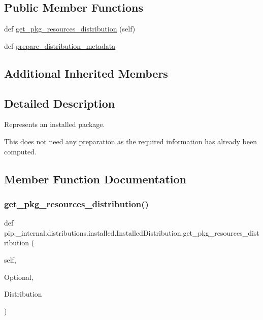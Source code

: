 \subsection*{Public Member Functions}
\begin{DoxyCompactItemize}
\item 
def \hyperlink{classpip_1_1__internal_1_1distributions_1_1installed_1_1InstalledDistribution_a9b4eab516d005429ca1562d5ec489ad4}{get\+\_\+pkg\+\_\+resources\+\_\+distribution} (self)
\item 
def \hyperlink{classpip_1_1__internal_1_1distributions_1_1installed_1_1InstalledDistribution_ab398383b63bcbe0767b61cfc8fa0bb7c}{prepare\+\_\+distribution\+\_\+metadata}
\end{DoxyCompactItemize}
\subsection*{Additional Inherited Members}


\subsection{Detailed Description}
\begin{DoxyVerb}Represents an installed package.

This does not need any preparation as the required information has already
been computed.
\end{DoxyVerb}
 

\subsection{Member Function Documentation}
\mbox{\label{classpip_1_1__internal_1_1distributions_1_1installed_1_1InstalledDistribution_a9b4eab516d005429ca1562d5ec489ad4}} 
\subsubsection{\texorpdfstring{get\+\_\+pkg\+\_\+resources\+\_\+distribution()}{get\_pkg\_resources\_distribution()}}
{\footnotesize\ttfamily def pip.\+\_\+internal.\+distributions.\+installed.\+Installed\+Distribution.\+get\+\_\+pkg\+\_\+resources\+\_\+distribution (\begin{DoxyParamCaption}\item[{}]{self,  }\item[{}]{Optional,  }\item[{}]{Distribution }\end{DoxyParamCaption})}

